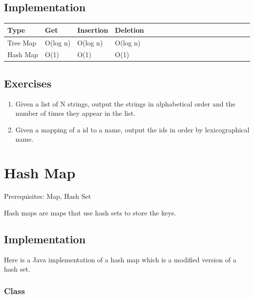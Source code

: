 \documentclass[11pt,oneside]{book}
\begin{document}
\subsection{Implementation}

\vspace{10px}\begin{tabulary}{0.4\linewidth}{|l|l|l|l|l|l|l|l|l|l|l|l|l|l|l|l|l|l|l}\hline


  Type &
  Get &
  Insertion &
  Deletion\\
\hline


  Tree Map &
  O(log n) &
  O(log n) &
  O(log n)\\

  Hash Map &
  O(1) &
  O(1) &
  O(1)\\

\hline\end{tabulary}

\subsection{Exercises}

\begin{enumerate}
\item Given a list of N strings, output the strings in alphabetical order and the number of times they appear in the list.
\item Given a mapping of a id to a name, output the ids in order by lexicographical name.
\end{enumerate}

        \section{ Hash Map }
        

Prerequisites: Map, Hash Set



Hash maps are maps that use hash sets to store the keys.

\subsection{Implementation}

Here is a Java implementation of a hash map which is a modified version of a hash set.

\subsubsection{Class}
\end{document}
